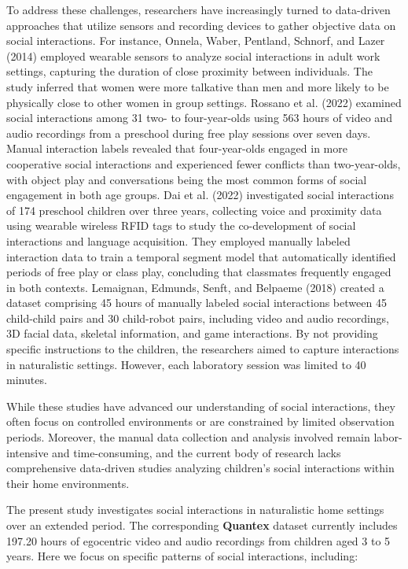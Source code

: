 \documentclass[
  man,floatsintext]{apa6}
\begin{document}
To address these challenges, researchers have increasingly turned to data-driven approaches that utilize sensors and recording devices to gather objective data on social interactions. For instance, Onnela, Waber, Pentland, Schnorf, and Lazer (2014) employed wearable sensors to analyze social interactions in adult work settings, capturing the duration of close proximity between individuals. The study inferred that women were more talkative than men and more likely to be physically close to other women in group settings. Rossano et al. (2022) examined social interactions among 31 two- to four-year-olds using 563 hours of video and audio recordings from a preschool during free play sessions over seven days. Manual interaction labels revealed that four-year-olds engaged in more cooperative social interactions and experienced fewer conflicts than two-year-olds, with object play and conversations being the most common forms of social engagement in both age groups. Dai et al. (2022) investigated social interactions of 174 preschool children over three years, collecting voice and proximity data using wearable wireless RFID tags to study the co-development of social interactions and language acquisition. They employed manually labeled interaction data to train a temporal segment model that automatically identified periods of free play or class play, concluding that classmates frequently engaged in both contexts. Lemaignan, Edmunds, Senft, and Belpaeme (2018) created a dataset comprising 45 hours of manually labeled social interactions between 45 child-child pairs and 30 child-robot pairs, including video and audio recordings, 3D facial data, skeletal information, and game interactions. By not providing specific instructions to the children, the researchers aimed to capture interactions in naturalistic settings. However, each laboratory session was limited to 40 minutes.

While these studies have advanced our understanding of social interactions, they often focus on controlled environments or are constrained by limited observation periods. Moreover, the manual data collection and analysis involved remain labor-intensive and time-consuming, and the current body of research lacks comprehensive data-driven studies analyzing children's social interactions within their home environments.

The present study investigates social interactions in naturalistic home settings over an extended period. The corresponding \textbf{Quantex} dataset currently includes 197.20 hours of egocentric video and audio recordings from children aged 3 to 5 years. Here we focus on specific patterns of social interactions, including:
\end{document}

